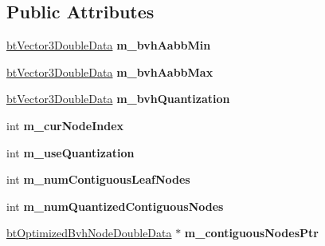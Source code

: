 \subsection*{Public Attributes}
\begin{DoxyCompactItemize}
\item 
\mbox{\label{structbtQuantizedBvhDoubleData_a7bd89e1cdd66b7fe895b5d49aa35d866}} 
\hyperlink{structbtVector3DoubleData}{bt\+Vector3\+Double\+Data} {\bfseries m\+\_\+bvh\+Aabb\+Min}
\item 
\mbox{\label{structbtQuantizedBvhDoubleData_aa20f8a0f413839885782bc0014e3f0aa}} 
\hyperlink{structbtVector3DoubleData}{bt\+Vector3\+Double\+Data} {\bfseries m\+\_\+bvh\+Aabb\+Max}
\item 
\mbox{\label{structbtQuantizedBvhDoubleData_adca4033b1e6ba0b15407eb63be26e393}} 
\hyperlink{structbtVector3DoubleData}{bt\+Vector3\+Double\+Data} {\bfseries m\+\_\+bvh\+Quantization}
\item 
\mbox{\label{structbtQuantizedBvhDoubleData_ab1ebc21cea28e7fb4c7a1652e3ef2934}} 
int {\bfseries m\+\_\+cur\+Node\+Index}
\item 
\mbox{\label{structbtQuantizedBvhDoubleData_a7c4abc65a4e3308f9a05214ae5f1e821}} 
int {\bfseries m\+\_\+use\+Quantization}
\item 
\mbox{\label{structbtQuantizedBvhDoubleData_a69092defbc1086ec7adba38decce0d01}} 
int {\bfseries m\+\_\+num\+Contiguous\+Leaf\+Nodes}
\item 
\mbox{\label{structbtQuantizedBvhDoubleData_acc18a222b5c81f088465956e3ca4ea94}} 
int {\bfseries m\+\_\+num\+Quantized\+Contiguous\+Nodes}
\item 
\mbox{\label{structbtQuantizedBvhDoubleData_ab9de70a46076521d70ec21a20c78abcf}} 
\hyperlink{structbtOptimizedBvhNodeDoubleData}{bt\+Optimized\+Bvh\+Node\+Double\+Data} $\ast$ {\bfseries m\+\_\+contiguous\+Nodes\+Ptr}
\item 
\mbox{\label{structbtQuantizedBvhDoubleData_acefca8412b5a9a6790a56b2c83b39d5c}} 

\end{DoxyCompactItemize}

